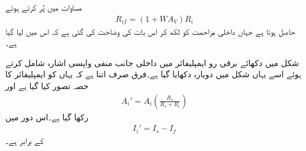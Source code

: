 مساوات  میں  پُر کرتے ہوئے
\begin{align}
R_{if}=\left(1+W A_V \right ) R_i
\end{align}
حاصل ہوتا ہے جہاں داخلی مزاحمت کو  لکھ کر اس بات کی وضاحت کی گئی ہے کہ اس میں  لیا گیا ہے۔

شکل  میں دکھائے برقی رو ایمپلیفائر میں داخلی جانب منفی واپسی اشارہ  شامل کرتے ہوئے اسے یہاں شکل  میں دوبارہ دکھایا گیا ہے۔فرق صرف اتنا ہے کہ یہاں  کو ایمپلیفائر کا حصہ تصور کیا گیا ہے اور
\begin{align} \label{مساوات_واپسی_داخلی_مزاحمت_شامل_کرتے_رو_افزائش}
A_i'=A_i \left (\frac{R_s}{R_s+R_i} \right )
\end{align}
رکھا گیا ہے۔اس دور میں 
\begin{align}
I_i'=I_s-I_f
\end{align}
کے برابر ہے۔

